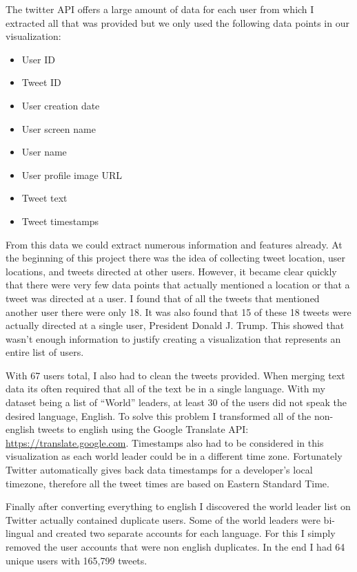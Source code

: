 \documentclass[journal]{vgtc}                %
\begin{document}
The twitter API offers a large amount of data for each user from which I extracted all that was provided but we only used the following data points in our visualization:

\begin{itemize}
  \item User ID
  \item Tweet ID
  \item User creation date
  \item User screen name
  \item User name
  \item User profile image URL
  \item Tweet text
  \item Tweet timestamps
\end{itemize}

From this data we could extract numerous information and features already.
At the beginning of this project there was the idea of collecting tweet location, user locations, and tweets directed at other users.
However, it became clear quickly that there were very few data points that actually mentioned a location or that a tweet was directed at a user.
I found that of all the tweets that mentioned another user there were only 18. 
It was also found that 15 of these 18 tweets were actually directed at a single user, President Donald J. Trump.
This showed that wasn't enough information to justify creating a visualization that represents an entire list of users.

With 67 users total, I also had to clean the tweets provided.
When merging text data its often required that all of the text be in a single language.
With my dataset being a list of ``World'' leaders, at least 30 of the users did not speak the desired language, English.
To solve this problem I transformed all of the non-english tweets to english using the Google Translate API: \url{https://translate.google.com}.
Timestamps also had to be considered in this visualization as each world leader could be in a different time zone.
Fortunately Twitter automatically gives back data timestamps for a developer's local timezone, therefore all the tweet times are based on Eastern Standard Time. 

Finally after converting everything to english I discovered the world leader list on Twitter actually contained duplicate users.
Some of the world leaders were bi-lingual and created two separate accounts for each language.
For this I simply removed the user accounts that were non english duplicates.
In the end I had 64 unique users with 165,799 tweets.
\end{document}
